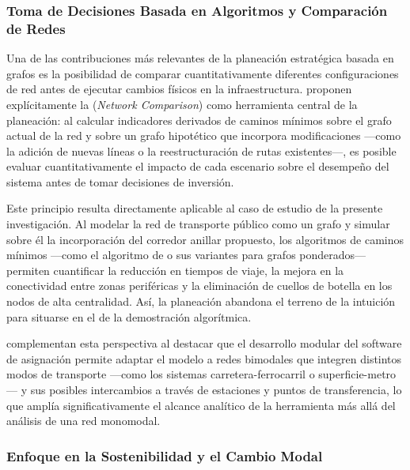 \subsubsection{Toma de Decisiones Basada en Algoritmos y Comparación de Redes}
\label{subsubsec:comparacion-redes}
 
Una de las contribuciones más relevantes de la planeación estratégica basada en
grafos es la posibilidad de comparar cuantitativamente diferentes
configuraciones de
red antes de ejecutar cambios físicos en la infraestructura.
\citet{fortin2016innovative} proponen explícitamente la
(\textit{Network Comparison}) como herramienta central de la planeación: al
calcular
indicadores derivados de caminos mínimos sobre el grafo actual de la red y sobre
un
grafo hipotético que incorpora modificaciones ---como la adición de nuevas
líneas o
la reestructuración de rutas existentes---, es posible evaluar cuantitativamente
el
impacto de cada escenario sobre el desempeño del sistema antes de tomar
decisiones de inversión.
 
Este principio resulta directamente aplicable al caso de estudio de la presente
investigación. Al modelar la red de transporte público como un grafo y simular
sobre
él la incorporación del corredor anillar propuesto, los algoritmos de caminos
mínimos
---como el algoritmo de \dijkstra{} o sus variantes para grafos ponderados---
permiten
cuantificar la reducción en tiempos de viaje, la mejora en la conectividad entre
zonas
periféricas y la eliminación de cuellos de botella en los nodos de alta
centralidad.
Así, la planeación abandona el terreno de la intuición para situarse en el de la
demostración algorítmica.
 
\citet{moreno2023} complementan esta perspectiva al destacar que el
desarrollo
modular del software de asignación permite adaptar el modelo a redes bimodales
que
integren distintos modos de transporte ---como los sistemas
carretera-ferrocarril o
superficie-metro--- y sus posibles intercambios a través de estaciones y puntos
de
transferencia, lo que amplía significativamente el alcance analítico de la
herramienta
más allá del análisis de una red monomodal.
 
\subsubsection{Enfoque en la Sostenibilidad y el Cambio Modal}
\label{subsubsec:sostenibilidad-cambio-modal}
 
